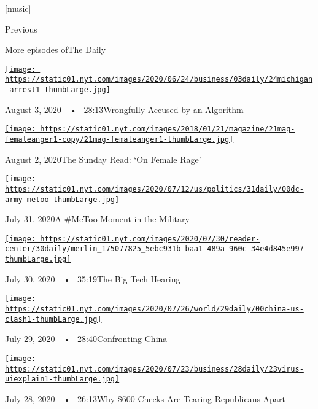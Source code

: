 {[}music{]}

Previous

More episodes ofThe Daily

\href{https://www.nytimes.com/2020/08/03/podcasts/the-daily/algorithmic-justice-racism.html?action=click\&module=audio-series-bar\&region=header\&pgtype=Article}{\texttt{[image: https://static01.nyt.com/images/2020/06/24/business/03daily/24michigan-arrest1-thumbLarge.jpg]}}

August 3, 2020~~•~ 28:13Wrongfully Accused by an Algorithm

\href{https://www.nytimes.com/2020/08/02/podcasts/the-daily/on-female-rage.html?action=click\&module=audio-series-bar\&region=header\&pgtype=Article}{\texttt{[image: https://static01.nyt.com/images/2018/01/21/magazine/21mag-femaleanger1-copy/21mag-femaleanger1-thumbLarge.jpg]}}

August 2, 2020The Sunday Read: `On Female Rage'

\href{https://www.nytimes.com/2020/07/31/podcasts/the-daily/vanessa-guillen-military-metoo.html?action=click\&module=audio-series-bar\&region=header\&pgtype=Article}{\texttt{[image: https://static01.nyt.com/images/2020/07/12/us/politics/31daily/00dc-army-metoo-thumbLarge.jpg]}}

July 31, 2020A \#MeToo Moment in the Military

\href{https://www.nytimes.com/2020/07/30/podcasts/the-daily/congress-facebook-amazon-google-apple.html?action=click\&module=audio-series-bar\&region=header\&pgtype=Article}{\texttt{[image: https://static01.nyt.com/images/2020/07/30/reader-center/30daily/merlin\_175077825\_5ebc931b-baa1-489a-960c-34e4d845e997-thumbLarge.jpg]}}

July 30, 2020~~•~ 35:19The Big Tech Hearing

\href{https://www.nytimes.com/2020/07/29/podcasts/the-daily/china-trump-foreign-policy.html?action=click\&module=audio-series-bar\&region=header\&pgtype=Article}{\texttt{[image: https://static01.nyt.com/images/2020/07/26/world/29daily/00china-us-clash1-thumbLarge.jpg]}}

July 29, 2020~~•~ 28:40Confronting China

\href{https://www.nytimes.com/2020/07/28/podcasts/the-daily/unemployment-benefits-coronavirus.html?action=click\&module=audio-series-bar\&region=header\&pgtype=Article}{\texttt{[image: https://static01.nyt.com/images/2020/07/23/business/28daily/23virus-uiexplain1-thumbLarge.jpg]}}

July 28, 2020~~•~ 26:13Why \$600 Checks Are Tearing Republicans Apart

